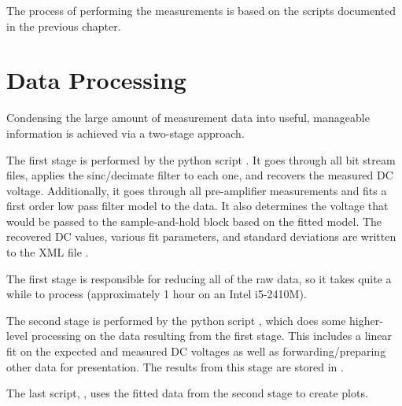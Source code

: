 The process of performing the measurements  is based on the scripts documented
in the previous chapter.


\section{Data Processing}
\label{sec:dataProcessing}

Condensing  the  large amount  of  measurement  data into  useful,  manageable
information is achieved via a two-stage approach.

The    first    stage     is     performed     by     the     python    script
. It goes through  all  bit  stream files,
applies  the  sinc/decimate filter to each one, and recovers the  measured  DC
voltage. Additionally, it goes through all pre-amplifier measurements and fits
a  first order low pass filter model to  the  data.  It  also  determines  the
voltage that would be passed to the sample-and-hold  block based on the fitted
model.  The  recovered   DC  values,  various  fit  parameters,  and  standard
deviations  are written to the XML file  .

The first stage  is  responsible for reducing all of the raw data, so it takes
quite  a  while to process  (approximately  1  hour  on  an  Intel  i5-2410M).

The     second    stage     is    performed     by    the     python    script
,  which  does   some  higher-level  processing  on
the  data resulting  from  the  first stage. This  includes  a  linear fit  on
the  expected  and  measured  DC  voltages  as  well  as  forwarding/preparing
other  data  for presentation. The  results  from  this  stage are  stored  in
.

The  last script, , uses the fitted data from  the
second stage to create plots.
